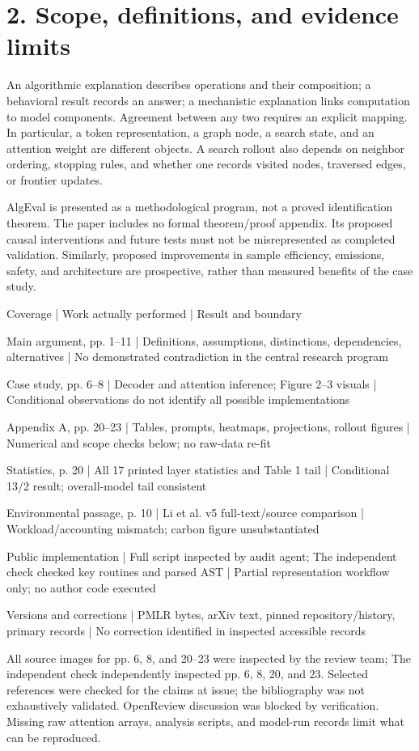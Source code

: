 \documentclass[10pt]{article}
\begin{document}
\section*{2. Scope, definitions, and evidence limits}
An algorithmic explanation describes operations and their composition; a behavioral result records an answer; a mechanistic explanation links computation to model components. Agreement between any two requires an explicit mapping. In particular, a token representation, a graph node, a search state, and an attention weight are different objects. A search rollout also depends on neighbor ordering, stopping rules, and whether one records visited nodes, traversed edges, or frontier updates.\par
AlgEval is presented as a methodological program, not a proved identification theorem. The paper includes no formal theorem/proof appendix. Its proposed causal interventions and future tests must not be misrepresented as completed validation. Similarly, proposed improvements in sample efficiency, emissions, safety, and architecture are prospective, rather than measured benefits of the case study.\par
Coverage | Work actually performed | Result and boundary\par
Main argument, pp. 1–11 | Definitions, assumptions, distinctions, dependencies, alternatives | No demonstrated contradiction in the central research program\par
Case study, pp. 6–8 | Decoder and attention inference; Figure 2–3 visuals | Conditional observations do not identify all possible implementations\par
Appendix A, pp. 20–23 | Tables, prompts, heatmaps, projections, rollout figures | Numerical and scope checks below; no raw-data re-fit\par
Statistics, p. 20 | All 17 printed layer statistics and Table 1 tail | Conditional 13/2 result; overall-model tail consistent\par
Environmental passage, p. 10 | Li et al. v5 full-text/source comparison | Workload/accounting mismatch; carbon figure unsubstantiated\par
Public implementation | Full script inspected by audit agent; The independent check checked key routines and parsed AST | Partial representation workflow only; no author code executed\par
Versions and corrections | PMLR bytes, arXiv text, pinned repository/history, primary records | No correction identified in inspected accessible records\par
All source images for pp. 6, 8, and 20–23 were inspected by the review team; The independent check independently inspected pp. 6, 8, 20, and 23. Selected references were checked for the claims at issue; the bibliography was not exhaustively validated. OpenReview discussion was blocked by verification. Missing raw attention arrays, analysis scripts, and model-run records limit what can be reproduced.\par
\end{document}
